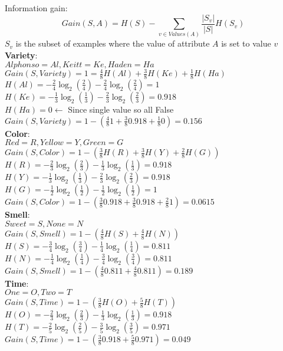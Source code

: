 \begin{enumerate}
\begin{enumerate}
    {\color{red}
      Information gain:
      \begin{equation}
        Gain(S, A) = H(S) - \sum_{v \in Values(A)}\frac{|S_v|}{|S|}H(S_v)
      \end{equation}
      $S_v$ is the subset of examples where the value of attribute $A$ is set to value $v$\\
      \textbf{Variety}:\\
      $Alphonso = Al, Keitt = Ke, Haden = Ha$\\
      $Gain(S, Variety) = 1 = \frac{4}{8}H(Al) + \frac{3}{8}H(Ke) + \frac{1}{8}H(Ha)$\\
      $H(Al) = -\frac{2}{4}\log_2(\frac{2}{4}) - \frac{2}{4}\log_2(\frac{2}{4}) = 1$\\
      $H(Ke) = -\frac{1}{3}\log_2(\frac{1}{3}) - \frac{2}{3}\log_2(\frac{2}{3}) = 0.918$\\
      $H(Ha) = 0 \leftarrow$ Since single value so all False\\
      $Gain(S, Variety) = 1 - \left(\frac{4}{8}1 + \frac{3}{8}0.918 + \frac{1}{8}0\right) = 0.156$\\
      \textbf{Color}:\\
      $Red = R, Yellow = Y, Green = G$\\
      $Gain(S, Color) = 1 - \left(\frac{3}{8}H(R) + \frac{3}{8}H(Y) + \frac{2}{8}H(G)\right)$\\
      $H(R) = -\frac{2}{3}\log_2(\frac{2}{3}) - \frac{1}{3}\log_2(\frac{1}{3}) = 0.918$\\
      $H(Y) = -\frac{1}{3}\log_2(\frac{1}{3}) - \frac{2}{3}\log_2(\frac{2}{3}) = 0.918$\\
      $H(G) = -\frac{1}{2}\log_2(\frac{1}{2}) - \frac{1}{2}\log_2(\frac{1}{2}) = 1$\\
      $Gain(S, Color) = 1 - \left(\frac{3}{8}0.918 + \frac{3}{8}0.918 + \frac{2}{8}1\right) = 0.0615$\\
      \textbf{Smell}:\\
      $Sweet = S, None = N$\\
      $Gain(S, Smell) = 1 - \left(\frac{4}{8}H(S) + \frac{4}{8}H(N)\right)$\\
      $H(S) = -\frac{3}{4}\log_2(\frac{3}{4}) - \frac{1}{4}\log_2(\frac{1}{4}) = 0.811$\\
      $H(N) = -\frac{1}{4}\log_2(\frac{1}{4}) - \frac{3}{4}\log_2(\frac{3}{4}) = 0.811$\\
      $Gain(S, Smell) = 1 - \left(\frac{4}{8}0.811 + \frac{4}{8}0.811\right) = 0.189$\\
      \textbf{Time}:\\
      $One = O, Two = T$\\
      $Gain(S, Time) = 1 - \left(\frac{3}{8}H(O) + \frac{5}{8}H(T)\right)$\\
      $H(O) = -\frac{2}{3}\log_2(\frac{2}{3}) - \frac{1}{3}\log_2(\frac{1}{3}) = 0.918$\\
      $H(T) = -\frac{2}{5}\log_2(\frac{2}{5}) - \frac{3}{5}\log_2(\frac{3}{5}) = 0.971$\\
      $Gain(S, Time) = 1 - \left(\frac{3}{8}0.918 + \frac{5}{8}0.971\right) = 0.049$\\
    }


\end{enumerate}
\end{enumerate}
